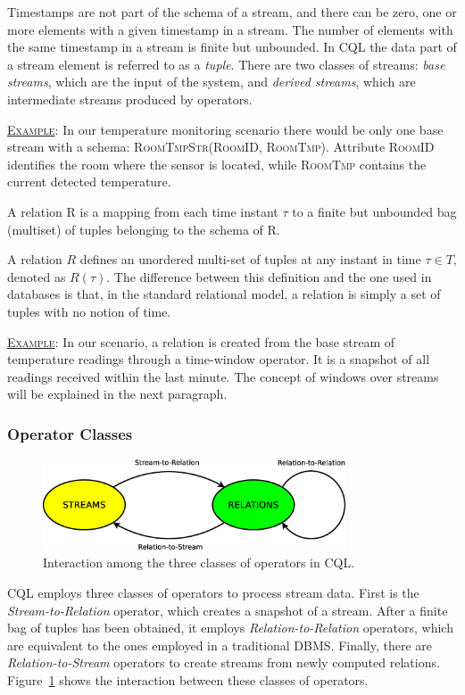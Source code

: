 Timestamps are not part of the schema of a stream, and there can be zero, one or more elements with
a given timestamp in a stream. The number of elements with the same timestamp in a stream is finite but
unbounded.
In CQL the data part of a stream element is referred to as a \textit{tuple}. There are
two classes of streams: \textit{base streams}, which are the input of the system, and \textit{derived
streams}, which are intermediate streams produced by operators. 

\underline{\textsc{Example}}: In our temperature monitoring scenario there would be only one base stream
with a schema: \textsc{RoomTmpStr(RoomID, RoomTmp)}. Attribute \textsc{RoomID} identifies the room where
the sensor is located, while \textsc{RoomTmp} contains the current detected temperature. 

\begin{definition}[Relation]{A relation R is a mapping from each time instant
$\tau$ to a finite but unbounded bag (multiset) of tuples belonging to the
schema of R.}
\end{definition}

A relation $R$ defines an unordered multi-set of tuples at any instant in time $\tau \in T$,
denoted as $R(\tau)$. The difference between this definition and the one used in databases is that, in
the standard relational model, a relation is simply a set of tuples with no notion of time. 

\underline{\textsc{Example}}: In our scenario, a relation is created from the base stream of
temperature readings through a time-window operator. It is a snapshot of all readings received within the last
minute. The concept of windows over streams will be explained in the next paragraph.

\subsubsection*{Operator Classes}
\begin{figure}[b]
\centering
\includegraphics[width=0.8\textwidth]{img/tesi/cql_ops} 
\caption{Interaction among the three classes of operators in CQL.}
\label{fig:cql_ops}
\end{figure}
CQL employs three classes of operators to process stream data. First is the \textit{Stream-to-Relation}
operator, which creates a snapshot of a stream. After a finite bag of tuples has been
obtained, it employs \textit{Relation-to-Relation} operators, which are equivalent to the ones employed in
a traditional DBMS. Finally, there are \textit{Relation-to-Stream} operators to create streams from
newly computed relations. Figure~\ref{fig:cql_ops} shows the interaction between these classes of
operators. 

